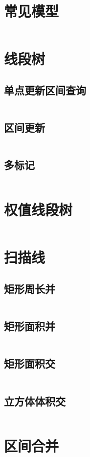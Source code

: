 \documentclass[a4paper,11pt]{article}
\begin{document}
\section*{常见模型}
\inputminted[]{c++}{Template/NetworkFlow/FlowModel.cpp}

\newpage
\section*{线段树}
\subsection*{单点更新区间查询}
\inputminted[]{c++}{Template/Segment/SegTreeI.cpp}
\subsection*{区间更新}
\inputminted[]{c++}{Template/Segment/SegTreeII.cpp}
\subsection*{多标记}
\inputminted[]{c++}{Template/Segment/SegTreeIII.cpp}

\section*{权值线段树}
\inputminted[]{c++}{Template/Segment/WeightSegTree.cpp}
\section*{扫描线}
\subsection*{矩形周长并}
\inputminted[]{c++}{Template/Segment/poj1177.cpp}
\subsection*{矩形面积并}
\inputminted[]{c++}{Template/Segment/hdu1542.cpp}
\subsection*{矩形面积交}
\inputminted[]{c++}{Template/Segment/hdu1255.cpp}
\subsection*{立方体体积交}
\inputminted[]{c++}{Template/Segment/hdu3642.cpp}
\section*{区间合并}
\inputminted[]{c++}{Template/Segment/SegmentMerge.cpp}
\end{document}
